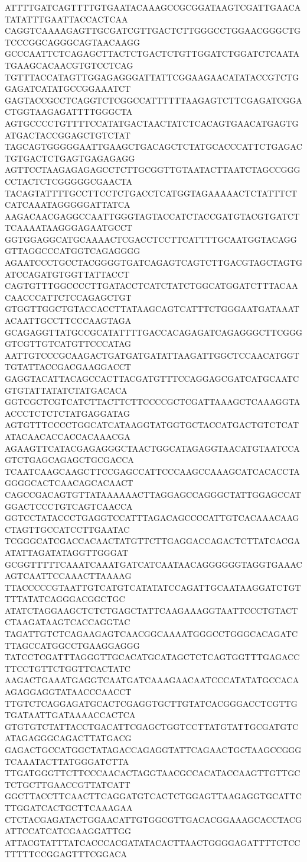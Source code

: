 ATTTTGATCAGTTTTGTGAATACAAAGCCGCGGATAAGTCGATTGAACATATATTTGAATTACCACTCAA
CAGGTCAAAAGAGTTGCGATCGTTGACTCTTGGGCCTGGAACGGGCTGTCCCGGCAGGGCAGTAACAAGG
GCCCAATTCTCAGAGCTTACTCTGACTCTGTTGGATCTGGATCTCAATATGAAGCACAACGTGTCCTCAG
TGTTTACCATAGTTGGAGAGGGATTATTCGGAAGAACATATACCGTCTGGAGATCATATGCCGGAAATCT
GAGTACCGCCTCAGGTCTCGGCCATTTTTTAAGAGTCTTCGAGATCGGACTGGTAAGAGATTTTGGGCTA
AGTGCCCCTGTTTTCCATATGACTAACTATCTCACAGTGAACATGAGTGATGACTACCGGAGCTGTCTAT
TAGCAGTGGGGGAATTGAAGCTGACAGCTCTATGCACCCATTCTGAGACTGTGACTCTGAGTGAGAGAGG
AGTTCCTAAGAGAGAGCCTCTTGCGGTTGTAATACTTAATCTAGCCGGGCCTACTCTCGGGGGCGAACTA
TACAGTATTTTGCCTTCCTCTGACCTCATGGTAGAAAAACTCTATTTCTCATCAAATAGGGGGATTATCA
AAGACAACGAGGCCAATTGGGTAGTACCATCTACCGATGTACGTGATCTTCAAAATAAGGGAGAATGCCT
GGTGGAGGCATGCAAAACTCGACCTCCTTCATTTTGCAATGGTACAGGGTTAGGCCCATGGTCAGAGGGG
AGAATCCCTGCCTACGGGGTGATCAGAGTCAGTCTTGACGTAGCTAGTGATCCAGATGTGGTTATTACCT
CAGTGTTTGGCCCCTTGATACCTCATCTATCTGGCATGGATCTTTACAACAACCCATTCTCCAGAGCTGT
GTGGTTGGCTGTACCACCTTATAAGCAGTCATTTCTGGGAATGATAAATACAATTGCCTTCCCAAGTAGA
GCAGAGGTTATGCCGCATATTTTGACCACAGAGATCAGAGGGCTTCGGGGTCGTTGTCATGTTCCCATAG
AATTGTCCCGCAAGACTGATGATGATATTAAGATTGGCTCCAACATGGTTGTATTACCGACGAAGGACCT
GAGGTACATTACAGCCACTTACGATGTTTCCAGGAGCGATCATGCAATCGTGTATTATATCTATGACACA
GGTCGCTCGTCATCTTACTTCTTCCCCGCTCGATTAAAGCTCAAAGGTAACCCTCTCTCTATGAGGATAG
AGTGTTTCCCCTGGCATCATAAGGTATGGTGCTACCATGACTGTCTCATATACAACACCACCACAAACGA
AGAAGTTCATACGAGAGGGCTAACTGGCATAGAGGTAACATGTAATCCAGTCTGAGCAGAGCTGCGACCA
TCAATCAAGCAAGCTTCCGAGCCATTCCCAAGCCAAAGCATCACACCTAGGGGCACTCAACAGCACAACT
CAGCCGACAGTGTTATAAAAAACTTAGGAGCCAGGGCTATTGGAGCCATGGACTCCCTGTCAGTCAACCA
GGTCCTATACCCTGAGGTCCATTTAGACAGCCCCATTGTCACAAACAAGCTAGTTGCCATCCTTGAATAC
TCGGGCATCGACCACAACTATGTTCTTGAGGACCAGACTCTTATCACGAATATTAGATATAGGTTGGGAT
GCGGTTTTTCAAATCAAATGATCATCAATAACAGGGGGGTAGGTGAAACAGTCAATTCCAAACTTAAAAG
TTACCCCCGTAATTGTCATGTCATATATCCAGATTGCAATAAGGATCTGTTTTATATCAGGGACGGCTGC
ATATCTAGGAAGCTCTCTGAGCTATTCAAGAAAGGTAATTCCCTGTACTCTAAGATAAGTCACCAGGTAC
TAGATTGTCTCAGAAGAGTCAACGGCAAAATGGGCCTGGGCACAGATCTTAGCCATGGCCTGAAGGAGGG
TATCCTCGATTTAGGGTTGCACATGCATAGCTCTCAGTGGTTTGAGACCTTCCTGTTCTGGTTCACTATC
AAGACTGAAATGAGGTCAATGATCAAAGAACAATCCCATATATGCCACAAGAGGAGGTATAACCCAACCT
TTGTCTCAGGAGATGCACTCGAGGTGCTTGTATCACGGGACCTCGTTGTGATAATTGATAAAACCACTCA
GTGTGTCTATTACCTGACATTCGAGCTGGTCCTTATGTATTGCGATGTCATAGAGGGCAGACTTATGACG
GAGACTGCCATGGCTATAGACCAGAGGTATTCAGAACTGCTAAGCCGGGTCAAATACTTATGGGATCTTA
TTGATGGGTTCTTCCCAACACTAGGTAACGCCACATACCAAGTTGTTGCTCTGCTTGAACCGTTATCATT
GGCTTACCTTCAACTTCAGGATGTCACTCTGGAGTTAAGAGGTGCATTCTTGGATCACTGCTTCAAAGAA
CTCTACGAGATACTGGAACATTGTGGCGTTGACACGGAAAGCACCTACGATTCCATCATCGAAGGATTGG
ATTACGTATTTATCACCCACGATATACACTTAACTGGGGAGATTTTCTCCTTTTTCCGGAGTTTCGGACA

